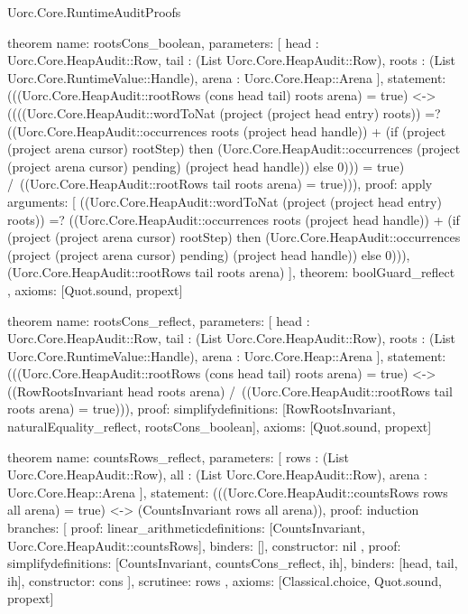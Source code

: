 \begin{lexlean}{Uorc.Core.RuntimeAuditProofs}
\begin{semanticmodule}
theorem{
  name: rootsCons_boolean,
  parameters: [
    head : Uorc.Core.HeapAudit::Row,
    tail : (List Uorc.Core.HeapAudit::Row),
    roots : (List Uorc.Core.RuntimeValue::Handle),
    arena : Uorc.Core.Heap::Arena
  ],
  statement: (((Uorc.Core.HeapAudit::rootRows (cons head tail) roots arena) = true) <-> ((((Uorc.Core.HeapAudit::wordToNat (project (project head entry) roots)) =? ((Uorc.Core.HeapAudit::occurrences roots (project head handle)) + (if (project (project arena cursor) rootStep) then (Uorc.Core.HeapAudit::occurrences (project (project arena cursor) pending) (project head handle)) else 0))) = true) /\ ((Uorc.Core.HeapAudit::rootRows tail roots arena) = true))),
  proof: apply{
    arguments: [
      ((Uorc.Core.HeapAudit::wordToNat (project (project head entry) roots)) =? ((Uorc.Core.HeapAudit::occurrences roots (project head handle)) + (if (project (project arena cursor) rootStep) then (Uorc.Core.HeapAudit::occurrences (project (project arena cursor) pending) (project head handle)) else 0))),
      (Uorc.Core.HeapAudit::rootRows tail roots arena)
    ],
    theorem: boolGuard_reflect
  },
  axioms: [Quot.sound, propext]
}

theorem{
  name: rootsCons_reflect,
  parameters: [
    head : Uorc.Core.HeapAudit::Row,
    tail : (List Uorc.Core.HeapAudit::Row),
    roots : (List Uorc.Core.RuntimeValue::Handle),
    arena : Uorc.Core.Heap::Arena
  ],
  statement: (((Uorc.Core.HeapAudit::rootRows (cons head tail) roots arena) = true) <-> ((RowRootsInvariant head roots arena) /\ ((Uorc.Core.HeapAudit::rootRows tail roots arena) = true))),
  proof: simplify{definitions: [RowRootsInvariant, naturalEquality_reflect, rootsCons_boolean]},
  axioms: [Quot.sound, propext]
}

theorem{
  name: countsRows_reflect,
  parameters: [
    rows : (List Uorc.Core.HeapAudit::Row),
    all : (List Uorc.Core.HeapAudit::Row),
    arena : Uorc.Core.Heap::Arena
  ],
  statement: (((Uorc.Core.HeapAudit::countsRows rows all arena) = true) <-> (CountsInvariant rows all arena)),
  proof: induction{
    branches: [
      {
        proof: linear_arithmetic{definitions: [CountsInvariant, Uorc.Core.HeapAudit::countsRows]},
        binders: [],
        constructor: nil
      },
      {
        proof: simplify{definitions: [CountsInvariant, countsCons_reflect, ih]},
        binders: [head, tail, ih],
        constructor: cons
      }
    ],
    scrutinee: rows
  },
  axioms: [Classical.choice, Quot.sound, propext]
}


\end{semanticmodule}
\end{lexlean}
